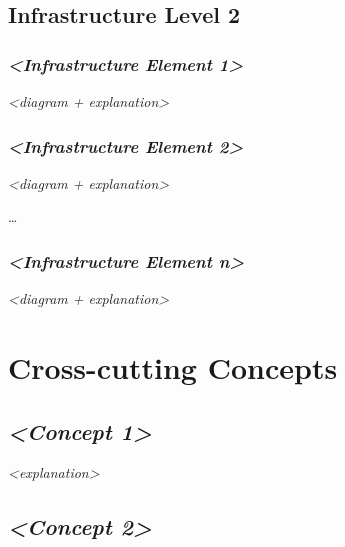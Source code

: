 \subsection{Infrastructure Level 2}\label{_infrastructure_level_2}

\subsubsection{\texorpdfstring{\emph{\textless{}Infrastructure Element
1\textgreater{}}}{\textless{}Infrastructure Element 1\textgreater{}}}\label{__emphasis_infrastructure_element_1_emphasis}

\emph{\textless{}diagram + explanation\textgreater{}}

\subsubsection{\texorpdfstring{\emph{\textless{}Infrastructure Element
2\textgreater{}}}{\textless{}Infrastructure Element 2\textgreater{}}}\label{__emphasis_infrastructure_element_2_emphasis}

\emph{\textless{}diagram + explanation\textgreater{}}

\ldots{}

\subsubsection{\texorpdfstring{\emph{\textless{}Infrastructure Element
n\textgreater{}}}{\textless{}Infrastructure Element n\textgreater{}}}\label{__emphasis_infrastructure_element_n_emphasis}

\emph{\textless{}diagram + explanation\textgreater{}}

\section{Cross-cutting Concepts}\label{section-concepts}

\subsection{\texorpdfstring{\emph{\textless{}Concept
1\textgreater{}}}{\textless{}Concept 1\textgreater{}}}\label{__emphasis_concept_1_emphasis}

\emph{\textless{}explanation\textgreater{}}

\subsection{\texorpdfstring{\emph{\textless{}Concept
2\textgreater{}}}{\textless{}Concept 2\textgreater{}}}\label{__emphasis_concept_2_emphasis}

